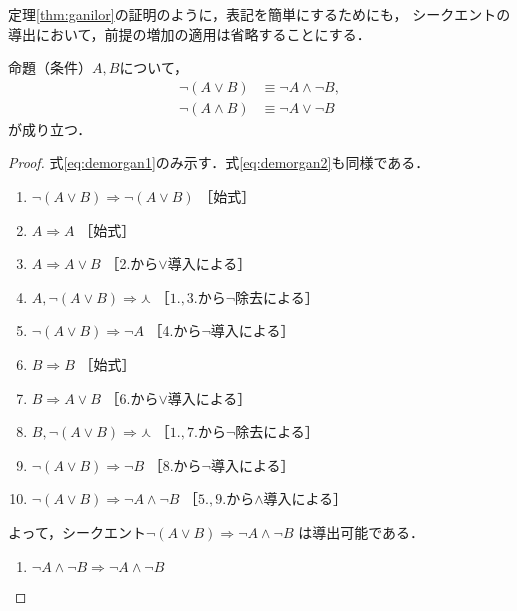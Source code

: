    定理\ref{thm:ganilor}の証明のように，表記を簡単にするためにも，
   シークエントの導出において，前提の増加の適用は省略することにする．
   
   \begin{thm} \label{thm:demorganmeidai}
     命題（条件）$A,  B$について，
     \begin{align}
       \lnot ( A \lor B ) & \equiv \lnot A \land \lnot B,
       \label{eq:demorgan1} \\
       \lnot ( A \land B ) & \equiv \lnot A \lor \lnot B
       \label{eq:demorgan2}
     \end{align}
     が成り立つ．
   \end{thm}
   \begin{proof}
     式\eqref{eq:demorgan1}のみ示す．式\eqref{eq:demorgan2}も同様である．
     \begin{enumerate}[1. ]
       \item $\lnot ( A \lor B ) \Longrightarrow \lnot ( A \lor B ) $ \quad ［始式］
       \item $ A \Longrightarrow A$ \quad ［始式］
       \item $A \Longrightarrow A \lor B $ \quad ［2.から$\lor$導入による］
       \item $A,  \lnot ( A \lor B ) \Longrightarrow \curlywedge$ 
              \quad ［$1., 3.$から$\lnot$除去による］
       \item $\lnot ( A \lor B ) \Longrightarrow \lnot A $ \quad ［4.から$\lnot$導入による］
       \item $B \Longrightarrow B$ \quad ［始式］
       \item $B \Longrightarrow A \lor B$ \quad ［6.から$\lor$導入による］
       \item $B,  \lnot ( A \lor B ) \Longrightarrow \curlywedge$
              \quad ［$1., 7.$から$\lnot$除去による］
       \item $\lnot ( A \lor B ) \Longrightarrow \lnot B$ 
              \quad ［8.から$\lnot$導入による］
       \item $\lnot ( A \lor B ) \Longrightarrow \lnot A \land \lnot B$
              \quad ［$5., 9.$から$\land$導入による］
     \end{enumerate}
     よって，シークエント$\lnot ( A \lor B ) \Longrightarrow \lnot A \land \lnot B$
     は導出可能である．
     \begin{enumerate}[1. ]
       \item $\lnot A \land \lnot B \Longrightarrow \lnot A \land \lnot B$

\end{enumerate}
\end{proof}
